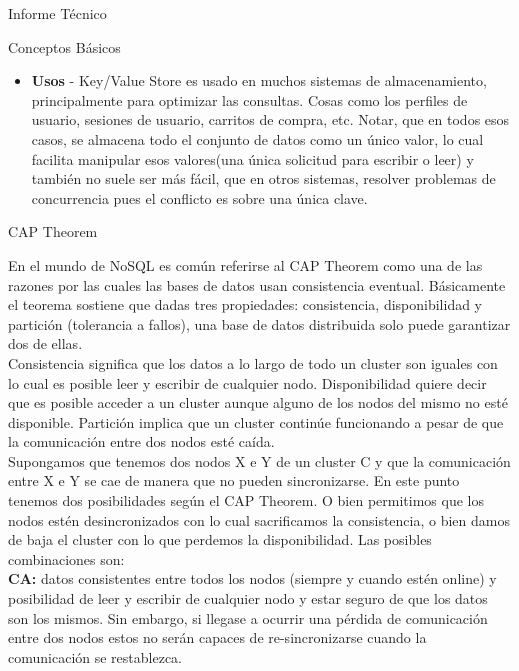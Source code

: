 \begin{section}{Informe T\'ecnico}
\begin{subsection}{Conceptos Básicos}
\begin{itemize}
\item \textbf{Usos} - Key/Value Store es usado en muchos sistemas de almacenamiento, principalmente para optimizar las consultas. Cosas como los perfiles de usuario, sesiones de usuario, carritos de compra, etc. Notar, que en todos esos casos, se almacena todo el conjunto de datos como un único valor, lo cual facilita manipular esos valores(una única solicitud para escribir o leer) y también no suele ser más fácil, que en otros sistemas, resolver problemas de concurrencia pues el conflicto es sobre una única clave.

\end{itemize}

\end{subsection}

\begin{subsection}{CAP Theorem}

En el mundo de NoSQL es común referirse al CAP Theorem como una de las razones por las cuales las bases de datos usan consistencia eventual. Básicamente el teorema sostiene que dadas tres propiedades: consistencia, disponibilidad y partición (tolerancia a fallos), una base de datos distribuida solo puede garantizar dos de ellas.\\

Consistencia significa que los datos a lo largo de todo un cluster son iguales con lo cual es posible leer y escribir de cualquier nodo. Disponibilidad quiere decir que es posible acceder a un cluster aunque alguno de los nodos del mismo no esté disponible. Partición implica que un cluster continúe funcionando a pesar de que la comunicación entre dos nodos esté caída.\\

Supongamos que tenemos dos nodos X e Y de un cluster C y que la comunicación entre X e Y se cae de manera que no pueden sincronizarse. En este punto tenemos dos posibilidades según el CAP Theorem. O bien permitimos que los nodos estén desincronizados con lo cual sacrificamos la consistencia, o bien damos de baja el cluster con lo que perdemos la disponibilidad. Las posibles combinaciones son: \\

\textbf{CA:} datos consistentes entre todos los nodos (siempre y cuando estén online) y posibilidad de leer y escribir de cualquier nodo y estar seguro de que los datos son los mismos. Sin embargo, si llegase a ocurrir una pérdida de comunicación entre dos nodos estos no serán capaces de re-sincronizarse cuando la comunicación se restablezca.\\


\end{subsection}
\end{section}
